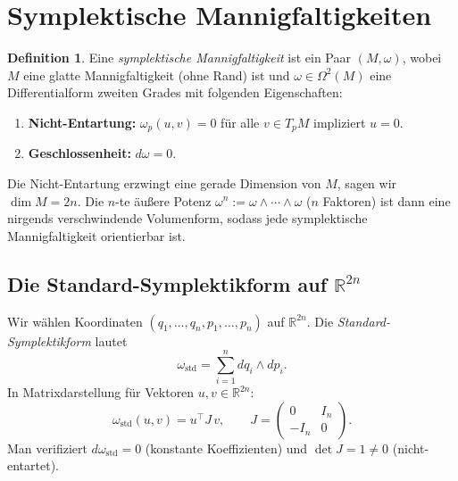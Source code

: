 \documentclass[12pt,a4paper]{amsart}
\theoremstyle{definition}
\newtheorem{definition}[theorem]{Definition}
\begin{document}
\section{Symplektische Mannigfaltigkeiten}
\label{sec:mannigfaltigkeiten}

\begin{definition}
Eine \emph{symplektische Mannigfaltigkeit} ist ein Paar $(M, \omega)$, wobei
$M$ eine glatte Mannigfaltigkeit (ohne Rand) ist und $\omega \in \Omega^{2}(M)$
eine Differentialform zweiten Grades mit folgenden Eigenschaften:
\begin{enumerate}[label=(\roman*)]
  \item \textbf{Nicht-Entartung:}  $\omega_p(u,v) = 0$ für alle $v \in T_p M$
        impliziert $u = 0$.
  \item \textbf{Geschlossenheit:}  $d\omega = 0$.
\end{enumerate}
\end{definition}

Die Nicht-Entartung erzwingt eine gerade Dimension von $M$, sagen wir
$\dim M = 2n$.  Die $n$-te äußere Potenz $\omega^n := \omega \wedge \cdots
\wedge \omega$ ($n$ Faktoren) ist dann eine nirgends verschwindende
Volumenform, sodass jede symplektische Mannigfaltigkeit orientierbar ist.

\subsection{Die Standard-Symplektikform auf \texorpdfstring{$\mathbb{R}^{2n}$}{R2n}}

Wir wählen Koordinaten $(q_1, \ldots, q_n, p_1, \ldots, p_n)$ auf
$\mathbb{R}^{2n}$.  Die \emph{Standard-Symplektikform} lautet
\begin{equation}\label{eq:omega_std}
  \omega_{\mathrm{std}} = \sum_{i=1}^{n} dq_i \wedge dp_i.
\end{equation}
In Matrixdarstellung für Vektoren $u, v \in \mathbb{R}^{2n}$:
\begin{equation}
  \omega_{\mathrm{std}}(u, v) = u^{\top} J\, v, \qquad
  J = \begin{pmatrix} 0 & I_n \\ -I_n & 0 \end{pmatrix}.
\end{equation}
Man verifiziert $d\omega_{\mathrm{std}} = 0$ (konstante Koeffizienten) und
$\det J = 1 \neq 0$ (nicht-entartet).
\end{document}
